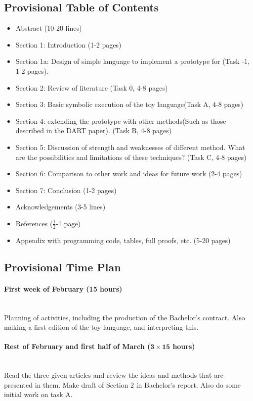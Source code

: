 \documentclass{article}
\newcommand{\timeest}[1]{$\mathbf{#1}$}%
\begin{document}
\subsection*{Provisional Table of Contents}
\begin{itemize}
    \item Abstract (10-20 lines)
    \item Section 1: Introduction (1-2 pages)
    \item Section 1a: Design of simple language to implement a prototype for (Task -1, 1-2 pages).
    \item Section 2: Review of literature (Task 0, 4-8 pages)
    \item Section 3: Basic symbolic execution of the toy language(Task A, 4-8 pages)
    \item Section 4: extending the prototype with other methods(Such as those described in the DART paper). (Task B, 4-8 pages)
    \item Section 5: Discussion of strength and weaknesses of different method.
    What are the possibilities and limitations of these techniques? (Task C, 4-8 pages)
    \item Section 6: Comparison to other work and ideas for future work (2-4 pages)
    \item Section 7: Conclusion (1-2 pages)
    \item Acknowledgements (3-5 lines)
    \item References ($\frac{1}{2}$-1 page)
    \item Appendix with programming code, tables, full proofs, etc. (5-20 pages)
\end{itemize}

\subsection*{Provisional Time Plan}


\paragraph{First week of February (15 hours)}~\\\noindent
Planning of activities, including the production of the Bachelor's contract.
Also making a first edition of the toy language, and interpreting this.

\paragraph{Rest of February and first half of March (\timeest{3\times 15} hours)}~\\\noindent
Read the three given articles and review the ideas and methods that are presented in them. Make draft of Section 2 in Bachelor's report. Also do some initial work on task A.
\end{document}
